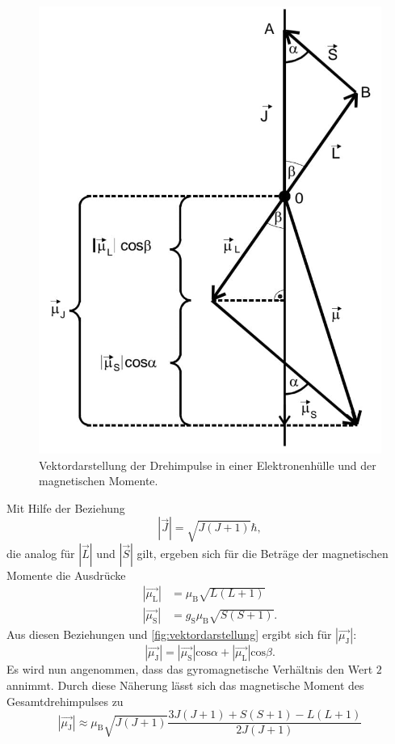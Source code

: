 \begin{figure}[H]
	\centering
	\includegraphics[width=0.6\linewidth]{data/vektordiagramm.jpeg}
	\caption{Vektordarstellung der Drehimpulse in einer Elektronenhülle und der magnetischen Momente.}
	\label{fig:vektordarstellung}
\end{figure}
\noindent
Mit Hilfe der Beziehung
\begin{equation*}
\left|\vec{J}\right| = \sqrt{J(J+1)}\hbar,
\end{equation*}
die analog für $\left|\vec{L}\right|$ und $\left|\vec{S}\right|$ gilt, ergeben sich für die Beträge der magnetischen Momente die Ausdrücke
\begin{align}
\label{eq:eq3}
\left|\vec{\mu_\text{L}}\right| &= \mu_\text{B}\sqrt{L(L+1)} \\
\left|\vec{\mu_\text{S}}\right| &= g_\text{S}\mu_\text{B}\sqrt{S(S+1)}.
\end{align}
Aus diesen Beziehungen und \autoref{fig:vektordarstellung} ergibt sich für $\left|\vec{\mu_\text{J}}\right|$:
\begin{equation}
\left|\vec{\mu_\text{J}}\right| = \left|\vec{\mu_\text{S}}\right|\text{cos}\alpha + \left|\vec{\mu_\text{L}}\right|\text{cos}\beta.
\end{equation}
Es wird nun angenommen, dass das gyromagnetische Verhältnis den Wert $2$ annimmt. Durch diese Näherung lässt sich das magnetische Moment des Gesamtdrehimpulses zu
\begin{equation}
\label{eq:eq4}
\left|\vec{\mu_\text{J}}\right| \approx \mu_\text{B} \sqrt{J(J+1)} \frac{3J(J+1)+S(S+1)-L(L+1)}{2J(J+1)}
\end{equation}
